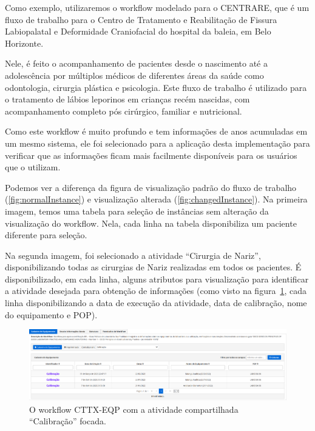 Como exemplo, utilizaremos o workflow modelado para o CENTRARE, que é um fluxo de trabalho para o Centro de Tratamento e Reabilitação de Fissura Labiopalatal e Deformidade Craniofacial do hospital da baleia, em Belo Horizonte.

Nele, é feito o acompanhamento de pacientes desde o nascimento até a adolescência por múltiplos médicos de diferentes áreas da saúde como odontologia, cirurgia plástica e psicologia. Este fluxo de trabalho é utilizado para o tratamento de lábios leporinos em crianças recém nascidas, com acompanhamento completo pós cirúrgico, familiar e nutricional.

Como este workflow é muito profundo e tem informações de anos acumuladas em um mesmo sistema, ele foi selecionado para a aplicação desta implementação para verificar que as informações ficam mais facilmente disponíveis para os usuários que o utilizam.

Podemos ver a diferença da figura de visualização padrão do fluxo de trabalho (\ref{fig:normalInstance}) e visualização alterada (\ref{fig:changedInstance}). Na primeira imagem, temos uma tabela para seleção de instâncias sem alteração da visualização do workflow. Nela, cada linha na tabela disponibiliza um paciente diferente para seleção.

Na segunda imagem, foi selecionado a atividade ``Cirurgia de Nariz'', disponibilizando todas as cirurgias de Nariz realizadas em todos os pacientes. É disponibilizado, em cada linha, alguns atributos para visualização para identificar a atividade desejada para obtenção de informações (como visto na figura~\ref{fig:cttx_eqp_calibracao_focada}, cada linha disponibilizando a data de execução da atividade, data de calibração, nome do equipamento e POP).

\begin{figure}
    \centering
    \includegraphics[width=1\textwidth]{imgs/CTTX-EQP/cttx_eqp_calibracao_focada.png}
    \caption{O workflow CTTX-EQP com a atividade compartilhada ``Calibração'' focada.}
    \label{fig:cttx_eqp_calibracao_focada}
\end{figure}

